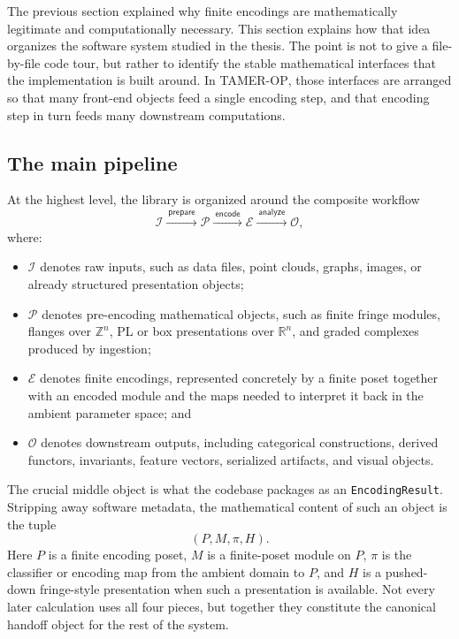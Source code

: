\documentclass[11pt]{article}
\newcommand{\TAMER}{\textsc{TAMER-OP}}
\theoremstyle{definition}
\theoremstyle{remark}
\begin{document}
The previous section explained why finite encodings are mathematically legitimate and computationally necessary.  This section explains how that idea organizes the software system studied in the thesis.  The point is not to give a file-by-file code tour, but rather to identify the stable mathematical interfaces that the implementation is built around.  In \TAMER{}, those interfaces are arranged so that many front-end objects feed a single encoding step, and that encoding step in turn feeds many downstream computations.

\subsection{The main pipeline}

At the highest level, the library is organized around the composite workflow
\[
\mathcal{I}
\xrightarrow{\ \mathsf{prepare}\ }
\mathcal{P}
\xrightarrow{\ \mathsf{encode}\ }
\mathcal{E}
\xrightarrow{\ \mathsf{analyze}\ }
\mathcal{O},
\]
where:
\begin{itemize}[leftmargin=1.5em]
    \item $\mathcal{I}$ denotes raw inputs, such as data files, point clouds, graphs, images, or already structured presentation objects;
    \item $\mathcal{P}$ denotes pre-encoding mathematical objects, such as finite fringe modules, flanges over $\mathbb{Z}^n$, PL or box presentations over $\mathbb{R}^n$, and graded complexes produced by ingestion;
    \item $\mathcal{E}$ denotes finite encodings, represented concretely by a finite poset together with an encoded module and the maps needed to interpret it back in the ambient parameter space; and
    \item $\mathcal{O}$ denotes downstream outputs, including categorical constructions, derived functors, invariants, feature vectors, serialized artifacts, and visual objects.
\end{itemize}

The crucial middle object is what the codebase packages as an \texttt{EncodingResult}.  Stripping away software metadata, the mathematical content of such an object is the tuple
\[
(P,M,\pi,H).
\]
Here $P$ is a finite encoding poset, $M$ is a finite-poset module on $P$, $\pi$ is the classifier or encoding map from the ambient domain to $P$, and $H$ is a pushed-down fringe-style presentation when such a presentation is available.  Not every later calculation uses all four pieces, but together they constitute the canonical handoff object for the rest of the system.
\end{document}
